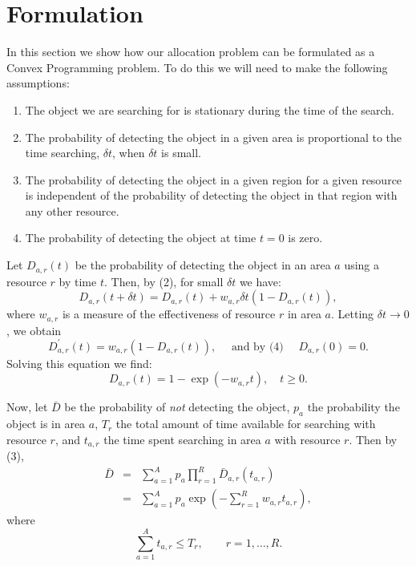 
\section{Formulation}
\label{sec:form}

In this section we show how our allocation problem can be formulated
as a Convex Programming problem. To do this we will need to make the
following assumptions:
\begin{enumerate}
\item The object we are searching for is stationary during the time of
the search.
\item The probability of detecting the object in a given area is
proportional to the time searching, $\delta t$, when $\delta t$ is
small.
\item The probability of detecting the object in a given region for a
given resource is independent of the probability of detecting the
object in that region with any other resource.
\item The probability of detecting the object at time $t=0$ is zero.
\end{enumerate}

Let $D_{a,r}(t)$ be the probability of detecting the object in an area
$a$ using a resource $r$ by time $t$. Then, by (2), for small $\delta
t$ we have:
$$D_{a,r}(t + \delta t) = D_{a,r}(t) + w_{a,r}\delta t(1-D_{a,r}(t)),$$
where $w_{a,r}$ is a measure of the effectiveness of resource $r$ in
area $a$. Letting $\delta t\to 0$, we obtain
$$D_{a,r}^\prime(t) = w_{a,r}(1-D_{a,r}(t)),\quad\mbox{ and by (4) }\quad 
D_{a,r}(0) = 0.$$ 
Solving this equation we find:
$$D_{a,r}(t) = 1-\exp(-w_{a,r}t), \quad t\ge 0.$$

Now, let $\bar{D}$ be the probability of \emph{not} detecting the
object, $p_a$ the probability the object is in area $a$, $T_r$ the
total amount of time available for searching with resource $r$, and
$t_{a,r}$ the time spent searching in area $a$ with resource $r$. Then
by (3),
\begin{eqnarray*}
\bar{D} &=& \sum_{a = 1}^A p_a\prod_{r = 1}^R \bar{D}_{a,r}(t_{a,r})\\
&=& \sum_{a = 1}^A p_a \exp\left(-\sum_{r = 1}^R w_{a,r}t_{a,r}\right), 
\end{eqnarray*}
where 
$$
\sum_{a = 1}^A t_{a,r} \le T_r, \qquad r = 1,\ldots,R.
$$
\newpage

